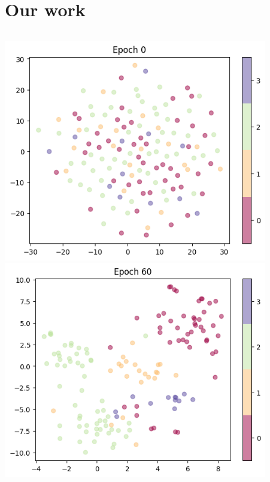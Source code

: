 \documentclass[10pt, aspectratio=169]{beamer}
\begin{document}
\section{Our work}
\begin{frame}
   \begin{columns}
       \begin{column}{0.33\textwidth}
           \centering
           \includegraphics[width=0.9\textwidth]{./graphics/epoch0.png}
           \includegraphics[width=0.9\textwidth]{./graphics/epoch60.png}
       \end{column}
       \begin{column}{0.33\textwidth}
           \centering

\end{column}
\end{columns}
\end{frame}
\end{document}
